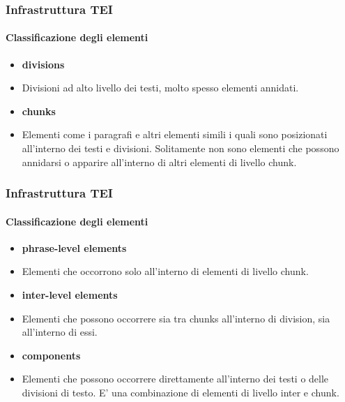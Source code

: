 \begin{frame}
    \frametitle{Infrastruttura TEI}
    \framesubtitle{Classificazione degli elementi}
    \addtocounter{nframe}{1}
   
    \begin{itemize}
       \item \textbf{divisions}
       \item[] Divisioni ad alto livello dei testi, molto spesso elementi annidati.
    \end{itemize}

   \begin{itemize}
    \item \textbf{chunks}
    \item[] Elementi come i paragrafi e altri elementi simili i quali sono posizionati all'interno dei testi e divisioni. Solitamente non sono elementi che possono annidarsi o apparire all'interno di altri elementi di livello chunk.
    \end{itemize}

\end{frame}


\begin{frame}
    \frametitle{Infrastruttura TEI}
    \framesubtitle{Classificazione degli elementi}
    \addtocounter{nframe}{1}
   

    \begin{itemize}
        \item \textbf{phrase-level elements}
        \item[] Elementi che occorrono solo all'interno di elementi di livello chunk.
     \end{itemize}
 
    \begin{itemize}
     \item \textbf{inter-level elements}
     \item[] Elementi che possono occorrere sia tra chunks all'interno di division, sia all'interno di essi.
     \end{itemize}

     \begin{itemize}
        \item \textbf{components}
        \item[] Elementi che possono occorrere direttamente all'interno dei testi o delle divisioni di testo. E' una combinazione di elementi di livello inter e chunk.
        \end{itemize}
   
\end{frame}


